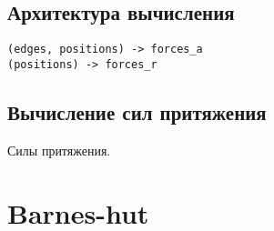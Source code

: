 \subsection{Архитектура вычисления}

\begin{verbatim}
(edges, positions) -> forces_a
(positions) -> forces_r
\end{verbatim}

\subsection{Вычисление сил притяжения}

Силы притяжения.

\section{Barnes-hut}


